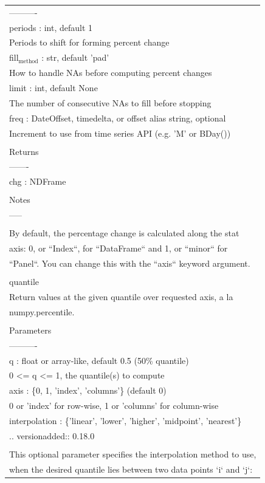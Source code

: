 \documentclass[11pt]{article}
\begin{document}
\begin{enumerate}
\begin{enumerate}
\begin{enumerate}
\begin{center}
\begin{tabular}{l}
----------\\
periods : int, default 1\\
Periods to shift for forming percent change\\
fill\(_{\text{method}}\) : str, default 'pad'\\
How to handle NAs before computing percent changes\\
limit : int, default None\\
The number of consecutive NAs to fill before stopping\\
freq : DateOffset, timedelta, or offset alias string, optional\\
Increment to use from time series API (e.g. 'M' or BDay())\\
\\
Returns\\
-------\\
chg : NDFrame\\
\\
Notes\\
-----\\
\\
By default, the percentage change is calculated along the stat\\
axis: 0, or ``Index``, for ``DataFrame`` and 1, or ``minor`` for\\
``Panel``. You can change this with the ``axis`` keyword argument.\\
\\
quantile\\
Return values at the given quantile over requested axis, a la\\
numpy.percentile.\\
\\
Parameters\\
----------\\
q : float or array-like, default 0.5 (50\% quantile)\\
0 <= q <= 1, the quantile(s) to compute\\
axis : \{0, 1, 'index', 'columns'\} (default 0)\\
0 or 'index' for row-wise, 1 or 'columns' for column-wise\\
interpolation : \{'linear', 'lower', 'higher', 'midpoint', 'nearest'\}\\
.. versionadded:: 0.18.0\\
\\
This optional parameter specifies the interpolation method to use,\\
when the desired quantile lies between two data points `i` and `j`:\\

\end{tabular}
\end{center}
\end{enumerate}
\end{enumerate}
\end{enumerate}
\end{document}
